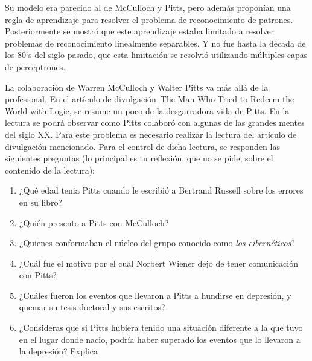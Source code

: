 \documentclass[10pt]{article}
\begin{document}
Su modelo era parecido al de McCulloch y Pitts, pero además proponían una regla de aprendizaje para resolver el problema de reconocimiento de patrones. Posteriormente se mostró que este aprendizaje estaba limitado a resolver problemas de reconocimiento linealmente separables. Y no fue hasta la década de los 80`s del siglo pasado, que esta limitación se resolvió utilizando múltiples capas de perceptrones.%

La colaboración de Warren McCulloch y Walter Pitts va más allá de la profesional. 
En el artículo de divulgación~\href{https://nautil.us/issue/21/information/the-man-who-tried-to-redeem-the-world-with-logic}{The Man Who Tried to Redeem the World with Logic}, 
se resume un poco de la desgarradora vida de Pitts. En la lectura se podrá observar como Pitts 
colaboró con algunas de las grandes mentes del siglo XX. Para este problema es necesario realizar 
la lectura del articulo de divulgación mencionado. Para el control de dicha lectura, se responden 
las siguientes preguntas (lo principal es tu reflexión, que no se pide, sobre el contenido de la lectura):%

\begin{enumerate}[noitemsep,topsep=\mdcompacttopsep]%

\item{}¿Qué edad tenia Pitts cuando le escribió a  Bertrand Russell sobre los errores en su libro?%

\item{}¿Quién presento a Pitts con McCulloch?%

\item{}¿Quienes conformaban el núcleo del grupo conocido como \emph{los cibernéticos}?%

\item{}¿Cuál fue el motivo por el cual Norbert Wiener dejo de tener comunicación con Pitts?%

\item{}¿Cuáles fueron los eventos que llevaron a Pitts a hundirse en depresión, y quemar su tesis doctoral y sus escritos?%

\item{}¿Consideras que si Pitts hubiera tenido una situación diferente a la que tuvo en el lugar donde nacio, podría haber superado los eventos que lo llevaron a la depresión? Explica%
\end{enumerate}%
\end{document}
